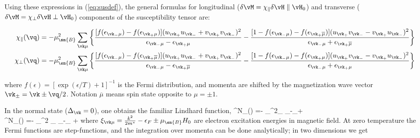 \documentclass[aps,prl,twocolumn,showpacs,amsmath,amssymb]{revtex4-1}
\def\opp#1{{\overline{ #1}}}
\begin{document}
Using these expressions in (\ref{eq:susdef}), the general formulas for 
longitudinal ($\delta \vM = \chi_\parallel \delta \vH \parallel \vH_0$)
and transverse ($\delta \vM = \chi_\perp \delta \vH \perp \vH_0$)
components of the susceptibility tensor are: 
\begin{widetext}
\begin{subequations}
\label{eq:chi}
\begin{align}
\label{eq:chia}
\chi_{\parallel}( \vq ) = -\mu_\sm{B}^2 \sum\limits_{\vk\mu}  \left\{
\frac{ [ f(\epsilon_{\vk_-\mu}) -f(\epsilon_{\vk_+\mu}) ] ( u_{\vk_+}u_{\vk_-}+v_{\vk_+}v_{\vk_-} )^2} 
     { \epsilon_{\vk_-\mu}-\epsilon_{\vk_+\mu} } 
-\frac{ [ 1-f(\epsilon_{\vk_-\mu})-f(\epsilon_{\vk_+\opp{\mu}}) ] ( u_{\vk_+}v_{\vk_-}-v_{\vk_+}u_{\vk_-} )^2 }
	{ \epsilon_{\vk_-\mu}+\epsilon_{\vk_+\opp{\mu}} }
\right\}
\\
\label{eq:chib}
\chi_{\perp}( \vq ) = -\mu_\sm{B}^2 \sum\limits_{\vk\mu} \left\{
\frac{ [ f(\epsilon_{\vk_-\mu})-f(\epsilon_{\vk_+\opp{\mu}}) ] ( u_{\vk_+}u_{\vk_-}+v_{\vk_+}v_{\vk_-} )^2 }
	{ \epsilon_{\vk_-\mu}-\epsilon_{\vk_+\opp{\mu}} } 
-\frac{ [ 1-f(\epsilon_{\vk_- \mu})-f(\epsilon_{\vk_+\mu}) ] ( u_{\vk_+}v_{\vk_-}-v_{\vk_+}u_{\vk_-} )^2 }
	{\epsilon_{\vk_-\mu}+\epsilon_{\vk_+\mu}} 
	\right\}
\end{align}
\end{subequations} 
\end{widetext}
where 
$f(\epsilon) = [ \exp(\epsilon/T)+1 ]^{-1}$ is the Fermi distribution, 
and momenta are shifted by the magnetization wave vector $\vk_\pm = \vk \pm \vq/2$. 
Notation $\opp{\mu}$ means spin state opposite to $\mu = \pm1$. 

%
In the normal state ($\Delta_\vk = 0$), one obtains the familiar 
Lindhard function,  
\bea
\label{eq:chiN}
\chi^N_{\parallel}(\vq) =- \mu_^2\sum\limits_{\vk\mu} 
	{ \xi_{\vk \mu}-\xi_{\vk+\vq \mu} } 
	\\
\chi^N_{\perp}(\vq) =- \mu_^2 \sum\limits_{\vk \mu} 
	\frac{ f(\xi_{\vk\mu})-f(\xi_{\vk+\vq \opp{\mu}}) }
	{ \xi_{\vk \mu}-\xi_{ \vk+\vq \opp{\mu}} }  \nonumber
\eea
where $\xi_{\vk \mu} = \frac{k^2}{2m^*}-\epsilon_F \pm \mu_\sm{B} H_0$ are electron excitation 
energies in magnetic field. 
At zero temperature the Fermi functions are step-functions, 
and the integration over momenta can be done analytically; 
in two dimensions we get 
\end{document}
